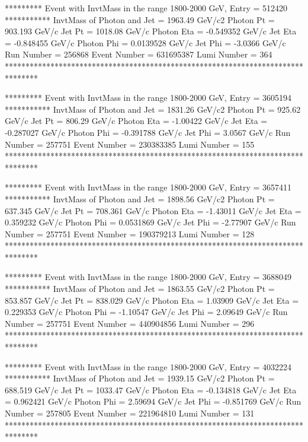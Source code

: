 ********* Event with InvtMass in the range 1800-2000 GeV, Entry = 512420 ***********
InvtMass of Photon and Jet = 1963.49 GeV/c2
Photon Pt = 903.193 GeV/c
Jet Pt = 1018.08 GeV/c
Photon Eta = -0.549352 GeV/c
Jet Eta = -0.848455 GeV/c
Photon Phi = 0.0139528 GeV/c
Jet Phi = -3.0366 GeV/c
Run Number = 256868
Event Number = 631695387
Lumi Number = 364
********************************************************************************
                                                                     
                                                                     
********* Event with InvtMass in the range 1800-2000 GeV, Entry = 3605194 ***********
InvtMass of Photon and Jet = 1831.26 GeV/c2
Photon Pt = 925.62 GeV/c
Jet Pt = 806.29 GeV/c
Photon Eta = -1.00422 GeV/c
Jet Eta = -0.287027 GeV/c
Photon Phi = -0.391788 GeV/c
Jet Phi = 3.0567 GeV/c
Run Number = 257751
Event Number = 230383385
Lumi Number = 155
********************************************************************************
                                                                     
                                                                     
********* Event with InvtMass in the range 1800-2000 GeV, Entry = 3657411 ***********
InvtMass of Photon and Jet = 1898.56 GeV/c2
Photon Pt = 637.345 GeV/c
Jet Pt = 708.361 GeV/c
Photon Eta = -1.43011 GeV/c
Jet Eta = 0.359232 GeV/c
Photon Phi = 0.0531869 GeV/c
Jet Phi = -2.77907 GeV/c
Run Number = 257751
Event Number = 190379213
Lumi Number = 128
********************************************************************************
                                                                     
                                                                     
********* Event with InvtMass in the range 1800-2000 GeV, Entry = 3688049 ***********
InvtMass of Photon and Jet = 1863.55 GeV/c2
Photon Pt = 853.857 GeV/c
Jet Pt = 838.029 GeV/c
Photon Eta = 1.03909 GeV/c
Jet Eta = 0.229353 GeV/c
Photon Phi = -1.10547 GeV/c
Jet Phi = 2.09649 GeV/c
Run Number = 257751
Event Number = 440904856
Lumi Number = 296
********************************************************************************
                                                                     
                                                                     
********* Event with InvtMass in the range 1800-2000 GeV, Entry = 4032224 ***********
InvtMass of Photon and Jet = 1939.15 GeV/c2
Photon Pt = 688.519 GeV/c
Jet Pt = 1033.47 GeV/c
Photon Eta = -0.134818 GeV/c
Jet Eta = 0.962421 GeV/c
Photon Phi = 2.59694 GeV/c
Jet Phi = -0.851769 GeV/c
Run Number = 257805
Event Number = 221964810
Lumi Number = 131
********************************************************************************
                                                                     
